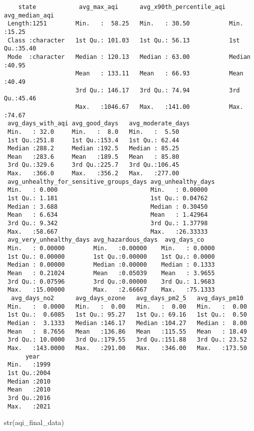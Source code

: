 \documentclass[
  12pt,
]{article}
\newenvironment{Shaded}{\begin{snugshade}}{\end{snugshade}}
\newcommand{\FunctionTok}[1]{\textcolor[rgb]{0.28,0.35,0.67}{#1}}
\newcommand{\NormalTok}[1]{\textcolor[rgb]{0.00,0.23,0.31}{#1}}
\begin{document}
\begin{verbatim}
    state            avg_max_aqi      avg_x90th_percentile_aqi avg_median_aqi 
 Length:1251        Min.   :  58.25   Min.   : 30.50           Min.   :15.25  
 Class :character   1st Qu.: 101.03   1st Qu.: 56.13           1st Qu.:35.40  
 Mode  :character   Median : 120.13   Median : 63.00           Median :40.95  
                    Mean   : 133.11   Mean   : 66.93           Mean   :40.49  
                    3rd Qu.: 146.17   3rd Qu.: 74.94           3rd Qu.:45.46  
                    Max.   :1046.67   Max.   :141.00           Max.   :74.67  
 avg_days_with_aqi avg_good_days   avg_moderate_days
 Min.   : 32.0     Min.   :  8.0   Min.   :  5.50   
 1st Qu.:251.8     1st Qu.:153.4   1st Qu.: 62.44   
 Median :288.2     Median :192.5   Median : 85.25   
 Mean   :283.6     Mean   :189.5   Mean   : 85.80   
 3rd Qu.:329.6     3rd Qu.:225.7   3rd Qu.:106.45   
 Max.   :366.0     Max.   :356.2   Max.   :277.00   
 avg_unhealthy_for_sensitive_groups_days avg_unhealthy_days
 Min.   : 0.000                          Min.   : 0.00000  
 1st Qu.: 1.181                          1st Qu.: 0.04762  
 Median : 3.688                          Median : 0.30450  
 Mean   : 6.634                          Mean   : 1.42964  
 3rd Qu.: 9.342                          3rd Qu.: 1.37798  
 Max.   :58.667                          Max.   :26.33333  
 avg_very_unhealthy_days avg_hazardous_days  avg_days_co     
 Min.   : 0.00000        Min.   :0.00000    Min.   : 0.0000  
 1st Qu.: 0.00000        1st Qu.:0.00000    1st Qu.: 0.0000  
 Median : 0.00000        Median :0.00000    Median : 0.1333  
 Mean   : 0.21024        Mean   :0.05039    Mean   : 3.9655  
 3rd Qu.: 0.07596        3rd Qu.:0.00000    3rd Qu.: 1.9683  
 Max.   :15.00000        Max.   :2.66667    Max.   :75.1333  
  avg_days_no2      avg_days_ozone   avg_days_pm2_5   avg_days_pm10   
 Min.   :  0.0000   Min.   :  0.00   Min.   :  0.00   Min.   :  0.00  
 1st Qu.:  0.6085   1st Qu.: 95.27   1st Qu.: 69.16   1st Qu.:  0.50  
 Median :  3.1333   Median :146.17   Median :104.27   Median :  8.00  
 Mean   :  8.7656   Mean   :136.86   Mean   :115.55   Mean   : 18.49  
 3rd Qu.: 10.0000   3rd Qu.:179.55   3rd Qu.:151.88   3rd Qu.: 23.52  
 Max.   :143.0000   Max.   :291.00   Max.   :346.00   Max.   :173.50  
      year     
 Min.   :1999  
 1st Qu.:2004  
 Median :2010  
 Mean   :2010  
 3rd Qu.:2016  
 Max.   :2021  
\end{verbatim}

\begin{Shaded}
\begin{Highlighting}[]
\FunctionTok{str}\NormalTok{(aqi\_final\_data)}
\end{Highlighting}
\end{Shaded}
\end{document}
